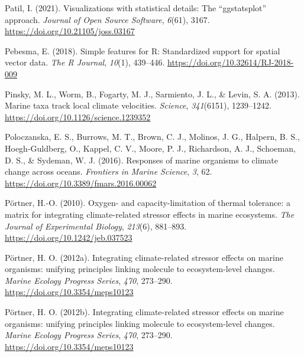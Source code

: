 \documentclass{CSUNthesis}
\begin{document}
\vspace{0.1em}

Patil, I. (2021). Visualizations with statistical details: The ``ggstatsplot'' approach. \textit{Journal of Open Source Software}, \textit{6}(61), 3167. \url{https://doi.org/10.21105/joss.03167}

\vspace{0.1em}

Pebesma, E. (2018). Simple features for R: Standardized support for spatial vector data. \textit{The R Journal}, \textit{10}(1), 439--446. \url{https://doi.org/10.32614/RJ-2018-009}

\vspace{0.1em}

Pinsky, M. L., Worm, B., Fogarty, M. J., Sarmiento, J. L., \& Levin, S. A. (2013). Marine taxa track local climate velocities. \textit{Science}, \textit{341}(6151), 1239--1242. \url{https://doi.org/10.1126/science.1239352}

\vspace{0.1em}

Poloczanska, E. S., Burrows, M. T., Brown, C. J., Molinos, J. G., Halpern, B. S., Hoegh-Guldberg, O., Kappel, C. V., Moore, P. J., Richardson, A. J., Schoeman, D. S., \& Sydeman, W. J. (2016). Responses of marine organisms to climate change across oceans. \textit{Frontiers in Marine Science}, \textit{3}, 62. \url{https://doi.org/10.3389/fmars.2016.00062}

\vspace{0.1em}

\vspace{0.1em}

Pörtner, H.-O. (2010). Oxygen- and capacity-limitation of thermal tolerance: a matrix for integrating climate-related stressor effects in marine ecosystems. \textit{The Journal of Experimental Biology}, \textit{213}(6), 881--893. \url{https://doi.org/10.1242/jeb.037523}

\vspace{0.1em}

Pörtner, H. O. (2012a). Integrating climate-related stressor effects on marine organisms: unifying principles linking molecule to ecosystem-level changes. \textit{Marine Ecology Progress Series}, \textit{470}, 273--290. \url{https://doi.org/10.3354/meps10123}

\vspace{0.1em}

Pörtner, H. O. (2012b). Integrating climate-related stressor effects on marine organisms: unifying principles linking molecule to ecosystem-level changes. \textit{Marine Ecology Progress Series}, \textit{470}, 273--290. \url{https://doi.org/10.3354/meps10123}
\end{document}
